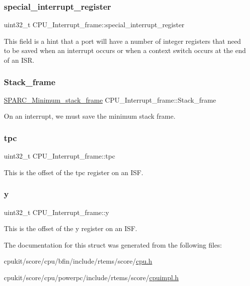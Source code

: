 \subsubsection{\texorpdfstring{special\_interrupt\_register}{special\_interrupt\_register}}
{\footnotesize\ttfamily uint32\+\_\+t C\+P\+U\+\_\+\+Interrupt\+\_\+frame\+::special\+\_\+interrupt\+\_\+register}

This field is a hint that a port will have a number of integer registers that need to be saved when an interrupt occurs or when a context switch occurs at the end of an I\+SR. \mbox{\label{structCPU__Interrupt__frame_a203c45865a21d7b0ae9a225fd0890917}} 
\subsubsection{\texorpdfstring{Stack\_frame}{Stack\_frame}}
{\footnotesize\ttfamily \mbox{\hyperlink{structSPARC__Minimum__stack__frame}{S\+P\+A\+R\+C\+\_\+\+Minimum\+\_\+stack\+\_\+frame}} C\+P\+U\+\_\+\+Interrupt\+\_\+frame\+::\+Stack\+\_\+frame}

On an interrupt, we must save the minimum stack frame. \mbox{\label{structCPU__Interrupt__frame_a6161bb5e703489990aba7abef9499aa1}} 
\subsubsection{\texorpdfstring{tpc}{tpc}}
{\footnotesize\ttfamily uint32\+\_\+t C\+P\+U\+\_\+\+Interrupt\+\_\+frame\+::tpc}

This is the offset of the tpc register on an I\+SF. \mbox{\label{structCPU__Interrupt__frame_ab667f53766f371d6ae54f0a59b885405}} 
\subsubsection{\texorpdfstring{y}{y}}
{\footnotesize\ttfamily uint32\+\_\+t C\+P\+U\+\_\+\+Interrupt\+\_\+frame\+::y}

This is the offset of the y register on an I\+SF. 

The documentation for this struct was generated from the following files\+:\begin{DoxyCompactItemize}
\item 
cpukit/score/cpu/bfin/include/rtems/score/\mbox{\hyperlink{bfin_2include_2rtems_2score_2cpu_8h}{cpu.\+h}}\item 
cpukit/score/cpu/powerpc/include/rtems/score/\mbox{\hyperlink{powerpc_2include_2rtems_2score_2cpuimpl_8h}{cpuimpl.\+h}}\end{DoxyCompactItemize}
